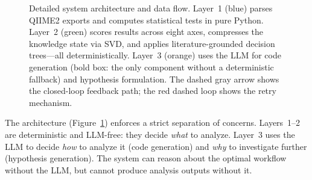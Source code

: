 \documentclass[11pt,a4paper]{article}
\begin{document}
\begin{figure}[t]
\caption{Detailed system architecture and data flow.
Layer~1 (blue) parses QIIME2 exports and computes statistical tests
in pure Python.
Layer~2 (green) scores results across eight axes, compresses the
knowledge state via SVD, and applies literature-grounded decision
trees---all deterministically.
Layer~3 (orange) uses the LLM for code generation (bold box: the
only component without a deterministic fallback) and hypothesis
formulation.
The dashed gray arrow shows the closed-loop feedback path; the red
dashed loop shows the retry mechanism.}
\label{fig:architecture}
\end{figure}

The architecture (Figure~\ref{fig:architecture}) enforces a strict
separation of concerns.
Layers~1--2 are deterministic and LLM-free: they decide
\textit{what} to analyze.
Layer~3 uses the LLM to decide \textit{how} to analyze it
(code generation) and \textit{why} to investigate further
(hypothesis generation).
The system can reason about the optimal workflow without the LLM,
but cannot produce analysis outputs without it.
\end{document}

